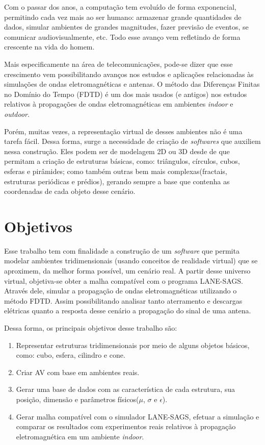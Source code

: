 	Com o passar dos anos, a computação tem evoluído de forma exponencial\cite{comp_history}, permitindo cada vez mais ao ser humano: armazenar grande quantidades de dados, simular ambientes de grandes magnitudes, fazer previsão de eventos, se comunicar audiovisualmente, etc. Todo esse avanço vem refletindo de forma crescente na vida do homem.

	Mais especificamente na área de telecomunicações, pode-se dizer que esse crescimento vem possibilitando avanços nos estudos e aplicações relacionadas às simulações de ondas eletromagnéticas e antenas. O método das Diferenças Finitas no Domínio do Tempo (FDTD)\cite{fdtd_intro} é um dos mais usados (e antigos) nos estudos relativos à propagações de ondas eletromagnéticas em ambientes \textit{indoor} e \textit{outdoor}\cite{rodrigo_intro}.

	Porém, muitas vezes, a representação virtual de desses ambientes não é uma tarefa fácil. Dessa forma, surge a necessidade de criação de \textit{softwares} que auxiliem nessa construção. Eles podem ser de modelagem 2D ou 3D desde de que permitam a criação de estruturas básicas, como: triângulos, círculos, cubos, esferas e pirâmides; como também outras bem mais complexas(fractais, estruturas periódicas e prédios), gerando sempre a base que contenha as coordenadas de cada objeto desse cenário.

\section{Objetivos}
	Esse trabalho tem com finalidade a construção de um \textit{software} que permita modelar ambientes tridimensionais (usando conceitos de realidade virtual) que se aproximem, da melhor forma possível, um cenário real. A partir desse universo virtual, objetiva-se obter a malha compatível com o programa LANE-SAGS. Através dele, simular a propagação de ondas eletromagnéticas utilizando o método FDTD. Assim possibilitando analisar tanto aterramento e descargas elétricas quanto a resposta desse cenário a propagação do sinal de uma antena.

	Dessa forma, os principais objetivos desse trabalho são:
\begin{enumerate}
\item {Representar estruturas tridimensionais por meio de alguns objetos básicos, como: cubo, esfera, cilindro e cone.}
\item {Criar AV com base em ambientes reais. }
\item {Gerar uma base de dados com as característica de cada estrutura, sua posição, dimensão e parâmetros físicos($\mu$, $\sigma$ e $\epsilon$).}
\item {Gerar malha compatível com o simulador LANE-SAGS, efetuar a simulação e comparar os resultados com experimentos reais relativos à propagação eletromagnética em um ambiente \textit{indoor}.}
\end{enumerate}

